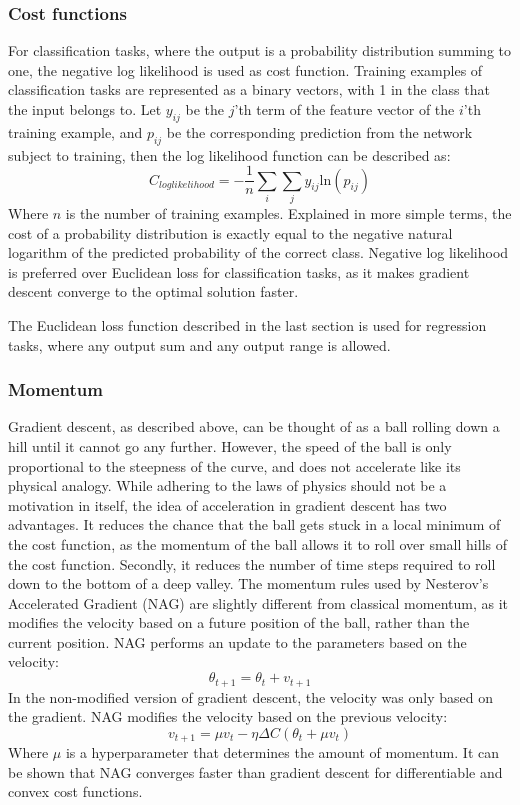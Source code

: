 \subsubsection{Cost functions}
\label{sec:negative}
For classification tasks, where the output is a probability distribution summing to one, the negative log likelihood is used as cost function. Training examples of classification tasks are represented as a binary vectors, with 1 in the class that the input belongs to. Let $y_{ij}$ be the $j$'th term of the feature vector of the $i$'th training example, and $p_{ij}$ be the corresponding prediction from the network subject to training, then the log likelihood function can be described as:
$$ C_{loglikelihood} = -\frac{1}{n} \sum_{i} \sum_{j} y_{ij}\text{ln}(p_{ij}) $$
Where $n$ is the number of training examples. Explained in more simple terms, the cost of a probability distribution is exactly equal to the negative natural logarithm of the predicted probability of the correct class. Negative log likelihood is preferred over Euclidean loss for classification tasks, as it makes gradient descent converge to the optimal solution faster\cite{Solla}.

The Euclidean loss function described in the last section is used for regression tasks, where any output sum and any output range is allowed.


\subsubsection{Momentum}
Gradient descent, as described above, can be thought of as a ball rolling down a hill until it cannot go any further. However, the speed of the ball is only proportional to the steepness of the curve, and does not accelerate like its physical analogy. While adhering to the laws of physics should not be a motivation in itself, the idea of acceleration in gradient descent has two advantages. It reduces the chance that the ball gets stuck in a local minimum of the cost function, as the momentum of the ball allows it to roll over small hills of the cost function. Secondly, it reduces the number of time steps required to roll down to the bottom of a deep valley. The momentum rules used by Nesterov's Accelerated Gradient (NAG) are slightly different from classical momentum, as it modifies the velocity based on a future position of the ball, rather than the current position. NAG performs an update to the parameters based on the velocity:
$$\theta_{t+1} = \theta_t + v_{t+1}$$
In the non-modified version of gradient descent, the velocity was only based on the gradient. NAG modifies the velocity based on the previous velocity:
$$v_{t+1} = \mu v_t - \eta \Delta C(\theta_t + \mu v_t)$$
Where $\mu$ is a hyperparameter that determines the amount of momentum. It can be shown that NAG converges faster than gradient descent for differentiable and convex cost functions\cite{Nesterov}.

